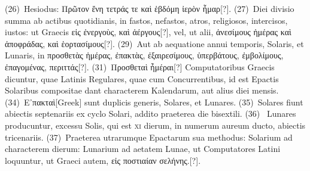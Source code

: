 \documentclass[draft,12pt,twoside,a4paper]{book}
\newcommand{\lnr}[1]{\nrfont({#1})~\normalfont}
\newcommand{\rnum}[1]{%
\textsc{#1}%
}
\begin{document}
\lnr{26}Hesiodus: \textgreek{Πρῶτον ἔνη τετράς τε καὶ ἑβδόμη ἰερὸν ἦμαρ[?]}.
\lnr{27}Diei divisio summa ab actibus quotidianis, in fastos, nefastos, atros,
religiosos, intercisos, iustos: ut Graecis
 \textgreek{εἰς ἐνεργοὺς, καὶ ἀέργους[?]}, vel, ut alii,
\textgreek{ἀνεσίμους ἡμέρας καὶ ἀποφράδας, καὶ ἑορτασίμους[?]}.
\lnr{29}Aut ab aequatione annui
temporis, Solaris, et Lunaris, in
 \textgreek{προσθετὰς ἡμέρας, ἐπακτὰς, ἐξαιρεσίμους,
ὑπερβάτους, ἐμβολίμους, ἐπαγομένας, περιττάς[?]}.
\lnr{31}\textgreek{Προσθεταὶ ἧμέραι[?]} Computatoribus
Graecis dicuntur, quae Latinis Regulares, quae cum Concurrentibus,
id est Epactis Solaribus compositae dant characterem Kalendarum,
aut alius diei mensis.
\lnr{34}\textgreek{Ε᾽πακταὶ[Greek]} sunt duplicis generis, Solares, et
Lunares.
\lnr{35}Solares fiunt abiectis septenariis ex cyclo Solari, addito praeterea
die bisextili.
\lnr{36}
Lunares producuntur, excessu Solis, qui est \rnum{xi} dierum,
in numerum aureum ducto, abiectis tricenariis.
\lnr{37}Praeterea utrarumque
Epactarum sua methodus: Solarium ad characterem dierum:
Lunarium ad aetatem Lunae, ut Computatores Latini loquuntur, ut
Graeci autem, \textgreek{εἰς ποστιαίαν σελήνης.[?]}.
\end{document}
